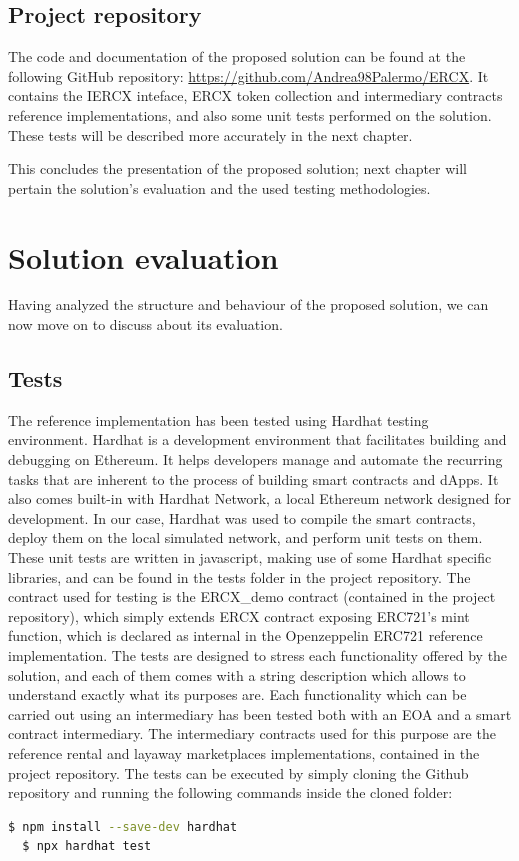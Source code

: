 \documentclass[english, LaM, oneside]{sapthesis}%
\begin{document}
\section{Project repository}
The code and documentation of the proposed solution can be found at the following GitHub repository: \url{https://github.com/Andrea98Palermo/ERCX}. It contains the IERCX inteface,  ERCX token collection and intermediary contracts reference implementations, and also some unit tests performed on the solution. These tests will be described more accurately in the next chapter.

\bigskip
\bigskip
This concludes the presentation of the proposed solution; next chapter will pertain the solution's evaluation and the used testing methodologies.


\chapter{Solution evaluation}
\label{chap:3}
Having analyzed the structure and behaviour of the proposed solution, we can now move on to discuss about its evaluation.

\section{Tests}
The reference implementation has been tested using Hardhat\cite{ref:hardhat} testing environment. Hardhat is a development environment that facilitates building and debugging on Ethereum. It helps developers manage and automate the recurring tasks that are inherent to the process of building smart contracts and dApps. It also comes built-in with Hardhat Network, a local Ethereum network designed for development. \newline
In our case, Hardhat was used to compile the smart contracts, deploy them on the local simulated network, and perform unit tests on them. These unit tests are written in javascript, making use of some Hardhat specific libraries, and can be found in the tests folder in the project repository. \newline
The contract used for testing is the ERCX\_demo contract (contained in the project repository), which simply extends ERCX contract exposing ERC721's mint function, which is declared as internal in the Openzeppelin ERC721 reference implementation.
The tests are designed to stress each functionality offered by the solution, and each of them comes with a string description which allows to understand exactly what its purposes are. Each functionality which can be carried out using an intermediary has been tested both with an EOA and a smart contract intermediary. The intermediary contracts used for this purpose are the reference rental and layaway marketplaces implementations, contained in the project repository. \newline
The tests can be executed by simply cloning the Github repository and running the following commands inside the cloned folder:
\begin{lstlisting}[language=bash]
  $ npm install --save-dev hardhat  
  $ npx hardhat test
\end{lstlisting}
\end{document}
